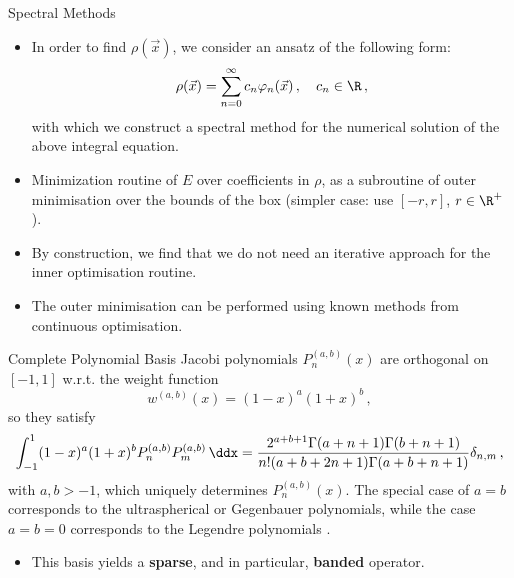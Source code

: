 \documentclass[aspectratio=169, hyperref={colorlinks=true}]{beamer}
\begin{document}
  \begin{frame}{Spectral Methods}
    \begin{itemize}
      \item In order to find $\rho(\vec{x})$, we consider an ansatz of the following form:
            $$\rho(\vec{x}) = \sum_{n=0}^{\infty} c_n \varphi_n(\vec{x})\,,\quad c_n \in \R\,,$$
            with which we construct a spectral method for the numerical solution of the above integral equation.
      \item Minimization routine of $E$ over coefficients in $\rho$, as a subroutine of outer minimisation over the bounds of the box (simpler case: use $[-r, r]$, $r \in \R^+$).
      \item By construction, we find that we do not need an iterative approach for the inner optimisation routine.
      \item The outer minimisation can be performed using known methods from continuous optimisation.
    \end{itemize}
  \end{frame}

  \begin{frame}{Complete Polynomial Basis}
    Jacobi polynomials $P_n^{(a,b)}(x)$ are orthogonal on $[-1,1]$ w.r.t. the weight function
    \begin{equation*}
      w^{(a,b)}(x)=(1-x)^a (1+x)^b\,,
    \end{equation*}
    so they satisfy
    \begin{align*}\label{eq:orthogonalityconditionJacobi}
      \int_{-1}^1(1-x)^a(1+x)^bP_n^{(a,b)}P_m^{(a,b)}\,\ddx = \frac{2^{a+b+1} \Gamma (a+n+1) \Gamma (b+n+1)}{n! (a+b+2 n+1) \Gamma (a+b+n+1)} \delta_{n,m}\,,
    \end{align*}
    with $a	,b>-1$, which uniquely determines $P_n^{(a,b)}(x)$. The special case of $a=b$ corresponds to the ultraspherical or Gegenbauer polynomials, while the case $a=b=0$ corresponds to the Legendre polynomials \cite{2018-nist}.

    \begin{itemize}
      \item This basis yields a \textbf{sparse}, and in particular, \textbf{banded} operator.
    \end{itemize}
  \end{frame}
\end{document}
